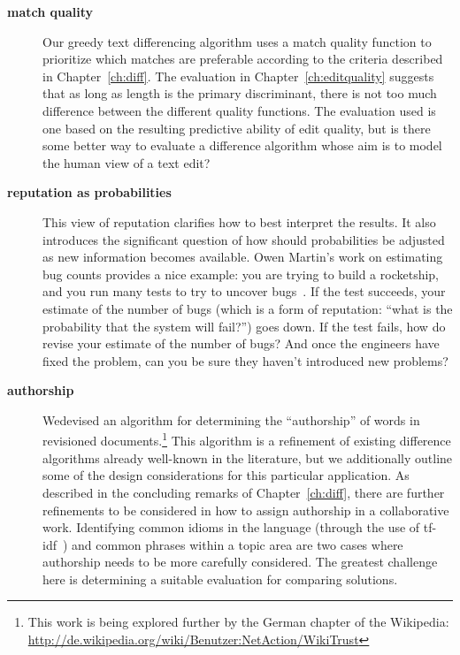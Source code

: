 \begin{description}
\item[\textbf{match quality}] Our greedy text differencing algorithm
    uses a match quality function to prioritize which matches are
    preferable according to the criteria described in Chapter~\ref{ch:diff}.
    The evaluation in Chapter~\ref{ch:editquality}
    suggests that as long as length
    is the primary discriminant, there is not too much difference
    between the different quality functions.
    The evaluation used is one based on the resulting predictive ability
    of edit quality, but is there some better way to evaluate a difference
    algorithm whose aim is to model the human view of a text edit?

\item[\textbf{reputation as probabilities}]  This view of reputation
    clarifies how to best interpret the results.
    It also introduces the significant question of how should probabilities
    be adjusted as new information becomes available.
    Owen Martin's work on estimating bug counts provides a nice example:
    you are trying to build a rocketship, and you run many
    tests to try to uncover bugs~\cite{Martin2011}.
    If the test succeeds, your estimate
    of the number of bugs (which is a form of reputation: ``what is
    the probability that the system will fail?'') goes down.
    If the test fails, how do revise your estimate of the number
    of bugs?  And once the engineers have fixed the problem, can
    you be sure they haven't introduced new problems?

\item[\textbf{authorship}]
    Wedevised an algorithm for determining the ``authorship'' of words in
    revisioned documents.\footnote{This work is being explored further
      by the German chapter of the Wikipedia: \\
        \url{http://de.wikipedia.org/wiki/Benutzer:NetAction/WikiTrust}}
    This algorithm is a refinement of existing difference algorithms
    already well-known in the literature, but we additionally outline
    some of the design considerations for this particular application.
    As described in the concluding remarks of
    Chapter~\ref{ch:diff}, there are further refinements to be
    considered in how to assign authorship in a collaborative work.
    Identifying common idioms in the language (\eg through the use of
    tf-idf~\cite{Jones1972}) and common phrases within a topic area
    are two cases where authorship needs to be more carefully considered.
    The greatest challenge here is
    determining a suitable evaluation for comparing solutions.

\end{description}

